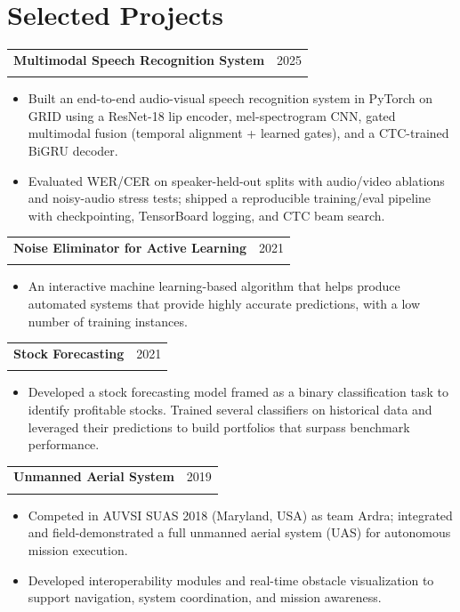 \documentclass[letterpaper,11pt]{article}
\makeatletter
\newcommand{\resumeItem}[1]{
  \item\small{
    {#1 \vspace{-2pt}}
  }
}
\newcommand{\resumeSubheading}[4]{
  \vspace{-2pt}\item
    \begin{tabular*}{0.97\textwidth}[t]{l@{\extracolsep{\fill}}r}
      \textbf{#1} & #2 \\
      \textit{\small#3} & \textit{\small #4} \\
    \end{tabular*}\vspace{-7pt}
}
\newcommand{\resumeItemListStart}{\begin{itemize}}
\newcommand{\resumeItemListEnd}{\end{itemize}\vspace{-5pt}}
\makeatother
\begin{document}
\section{Selected Projects}
\begin{justify}

\resumeSubheading{Multimodal Speech Recognition System} {2025}{}{} \vspace{-0.75em} 
\resumeItemListStart
\resumeItem{Built an end-to-end audio-visual speech recognition system in PyTorch on GRID using a ResNet-18 lip encoder, mel-spectrogram CNN, gated multimodal fusion (temporal alignment + learned gates), and a CTC-trained BiGRU decoder.}\vspace{-1.35em} \resumeItem{Evaluated WER/CER on speaker-held-out splits with audio/video ablations and noisy-audio stress tests; shipped a reproducible training/eval pipeline with checkpointing, TensorBoard logging, and CTC beam search.}
\resumeItemListEnd

\resumeSubheading{Noise Eliminator for Active Learning}{2021}{}{} \vspace{-0.75em}
\resumeItemListStart \resumeItem{An interactive machine learning-based algorithm that helps produce automated systems that provide highly accurate predictions, with a low number of training instances.}    \resumeItemListEnd

\resumeSubheading{Stock Forecasting}{2021}{}{} \vspace{-0.75em}
\resumeItemListStart \resumeItem{Developed a stock forecasting model framed as a binary classification task to identify profitable stocks. Trained several classifiers on historical data and leveraged their predictions to build portfolios that surpass benchmark performance.}    \resumeItemListEnd


\resumeSubheading{Unmanned Aerial System}{2019}{}{} \vspace{-0.95em}

\resumeItemListStart
\resumeItem{Competed in AUVSI SUAS 2018 (Maryland, USA) as team Ardra; integrated and field-demonstrated a full unmanned aerial system (UAS) for autonomous mission execution.}\vspace{-0.3em}
\resumeItem{Developed interoperability modules and real-time obstacle visualization to support navigation, system coordination, and mission awareness.}
\resumeItemListEnd

\end{justify}
\end{document}
